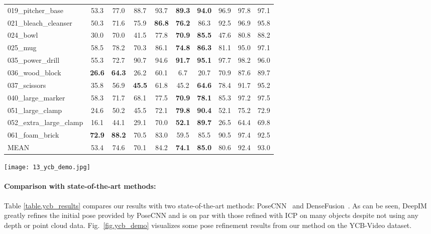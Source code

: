 \documentclass[twocolumn]{svjour3}
\newcommand{\dimnet}[0]{DeepIM}
\begin{document}
\begin{table*}[t]
\begin{tabular}{l|c|c|c|c|c|c|c|c|c}
019\_pitcher\_base & 53.3 & 77.0 & 88.7 & 93.7 &\textbf{ 89.3} &\textbf{ 94.0} & 96.9 & 97.8 & 97.1 \\
021\_bleach\_cleanser & 50.3 & 71.6 & 75.9 & \textbf{86.8} & \textbf{76.2} & 86.3 & 92.5 & 96.9 & 95.8 \\
024\_bowl & 30.0 & 70.0 & 41.5 & 77.8 & \textbf{70.9} &\textbf{ 85.5} & 47.6 & 80.8 & 88.2 \\
025\_mug & 58.5 & 78.2 & 70.3 & 86.1 & \textbf{74.8} & \textbf{86.3} & 81.1 & 95.0 & 97.1 \\
035\_power\_drill & 55.3 & 72.7 & 90.7 & 94.6 & \textbf{91.7} & \textbf{95.1} & 97.7 & 98.2 & 96.0 \\
036\_wood\_block &\textbf{ 26.6} &\textbf{ 64.3 }& 26.2 & 60.1 & 6.7 & 20.7 & 70.9 & 87.6 & 89.7 \\
037\_scissors & 35.8 & 56.9 & \textbf{45.5 }& 61.8 & 45.2 & \textbf{64.6} & 78.4 & 91.7 & 95.2 \\
040\_large\_marker & 58.3 & 71.7 & 68.1 & 77.5 & \textbf{70.9} & \textbf{78.1} & 85.3 & 97.2 & 97.5 \\
051\_large\_clamp & 24.6 & 50.2 & 45.5 & 72.1 &\textbf{ 79.8} & \textbf{90.4} & 52.1 & 75.2 & 72.9 \\
052\_extra\_large\_clamp & 16.1 & 44.1 & 29.1 & 70.0 & \textbf{52.1} &\textbf{ 89.7 }& 26.5 & 64.4 & 69.8 \\
061\_foam\_brick & \textbf{72.9} & \textbf{88.2} & 70.5 & 83.0 & 59.5 & 85.5 & 90.5 & 97.4 & 92.5 \\
\hline
MEAN & 53.4 & 74.6 & 70.1 & 84.2 & \textbf{74.1} &\textbf{ 85.0} & 80.6 & 92.4 & 93.0 \\

\hline
\end{tabular}
\label{table.ycb_results}
\end{table*}

\begin{figure*}[t]
	\centering
	\texttt{[image: 13\_ycb\_demo.jpg]}
\caption{Examples of refined poses on the YCB-Video dataset which use results from PoseCNN~\citep{xiang2017posecnn} as initial poses. The red and green lines represent the silhouettes of the initial estimates and our refined poses, respectively.}
\label{fig.ycb_demo}
\end{figure*}

\paragraph{Comparison with state-of-the-art methods:}
Table \ref{table.ycb_results} compares our results with two state-of-the-art methods: PoseCNN~\citep{xiang2017posecnn} and DenseFusion~\citep{wang2019densefusion}. As can be seen, \dimnet~ greatly refines the initial pose provided by PoseCNN and is on par with those refined with ICP on many objects despite not using any depth or point cloud data. Fig.~\ref{fig.ycb_demo} visualizes some pose refinement results from our method on the YCB-Video dataset.
\end{document}
